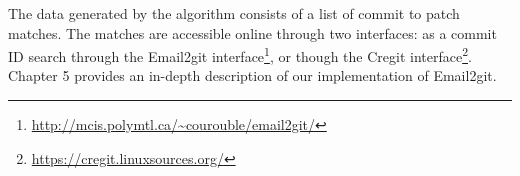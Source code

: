 The data generated by the algorithm consists of a list of commit to patch matches. The matches are accessible online through two interfaces: as a commit ID search through the Email2git interface\footnote{\url{http://mcis.polymtl.ca/~courouble/email2git/}}, or though the Cregit interface\footnote{\url{https://cregit.linuxsources.org/}}. Chapter 5 provides an in-depth description of our implementation of Email2git.






